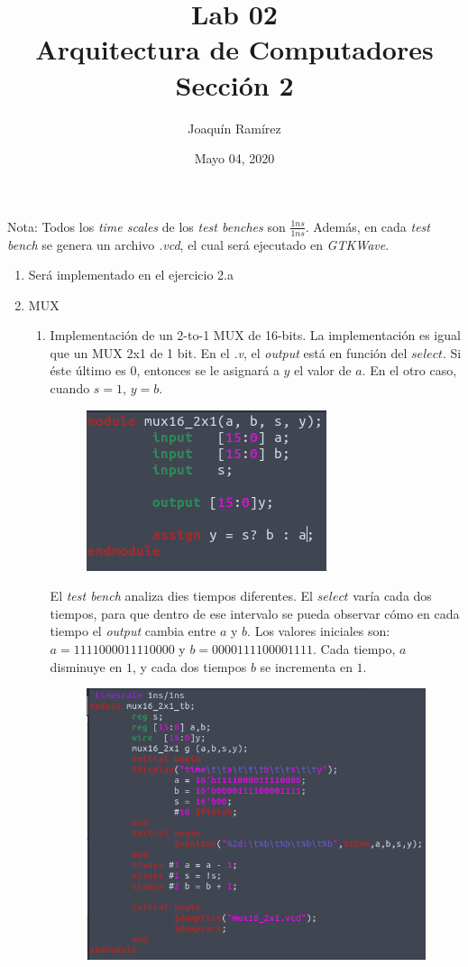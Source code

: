 \documentclass[11pt,a4paper]{article}
\title{Lab 02\\Arquitectura de Computadores \\ \Large{Sección 2}}
\author{Joaquín Ramírez}
\date{Mayo 04, 2020}
\begin{document}
\maketitle
Nota: Todos los \textit{time scales} de los \textit{test benches} son $\frac{1ns}{1ns}$. Además, en cada \textit{test bench} se genera un archivo \textit{.vcd}, el cual será ejecutado en \textit{GTKWave}.
\begin{enumerate}
\item Será implementado en el ejercicio 2.a
\item	MUX
\begin{enumerate}[label=(\alph*)]
\item Implementación de un 2-to-1 MUX de 16-bits. La implementación es igual que un MUX 2x1 de 1 bit. En el \textit{.v}, el \textit{output} está en función del $select$. Si éste último es $0$, entonces se le asignará a $y$ el valor de $a$. En el otro caso, cuando $s = 1$, $y = b$.
\begin{figure}[h!]
\centering
\includegraphics[scale=0.6]{16_2x1MUX_1.png} 
\end{figure}

El \textit{test bench} analiza dies tiempos diferentes. El $select$ varía cada dos tiempos, para que dentro de ese intervalo se pueda observar cómo en cada tiempo el \textit{output} cambia entre $a$ y $b$. Los valores iniciales son: $a = 1111000011110000$ y $b = 0000111100001111$. Cada tiempo, $a$ disminuye en $1$, y cada dos tiempos $b$ se incrementa en $1$.
\pagebreak

\begin{figure}[h!]
\centering
\includegraphics[scale=0.35]{16_2x1MUX_2.png} 
\end{figure}


\end{enumerate}
\end{enumerate}
\end{document}
